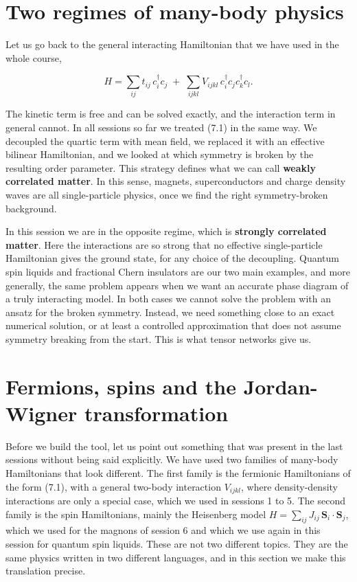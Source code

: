 \section{Two regimes of many-body physics}

Let us go back to the general interacting Hamiltonian that we have used in the whole course,

\begin{equation}
H = \sum_{ij} t_{ij}\, c_i^\dagger c_j \;+\; \sum_{ijkl} V_{ijkl}\, c_i^\dagger c_j c_k^\dagger c_l.
\end{equation}

The kinetic term is free and can be solved exactly, and the interaction term in general cannot. In all
sessions so far we treated (7.1) in the same way. We decoupled the quartic term with mean field, we
replaced it with an effective bilinear Hamiltonian, and we looked at which symmetry is broken by the
resulting order parameter. This strategy defines what we can call \textbf{weakly correlated matter}.
In this sense, magnets, superconductors and charge density waves are all single-particle physics,
once we find the right symmetry-broken background.

In this session we are in the opposite regime, which is \textbf{strongly correlated matter}. Here the
interactions are so strong that no effective single-particle Hamiltonian gives the ground state, for
any choice of the decoupling. Quantum spin liquids and fractional Chern insulators are our two main
examples, and more generally, the same problem appears when we want an accurate phase diagram of a
truly interacting model. In both cases we cannot solve the problem with an ansatz for the broken
symmetry. Instead, we need something close to an exact numerical solution, or at least a controlled
approximation that does not assume symmetry breaking from the start. This is what tensor networks
give us.

\section{Fermions, spins and the Jordan-Wigner transformation}

Before we build the tool, let us point out something that was present in the last sessions without
being said explicitly. We have used two families of many-body Hamiltonians that look different. The
first family is the fermionic Hamiltonians of the form (7.1), with a general two-body interaction
$V_{ijkl}$, where density-density interactions are only a special case, which we used in sessions 1 to 5. The second family is the spin Hamiltonians, mainly the
Heisenberg model $H =
\sum_{ij} J_{ij}\, \mathbf{S}_i \cdot \mathbf{S}_j$, which we used for the magnons of session 6 and
which we use again in this session for quantum spin liquids. These are not two different topics. They
are the same physics written in two different languages, and in this section we make this
translation precise.

